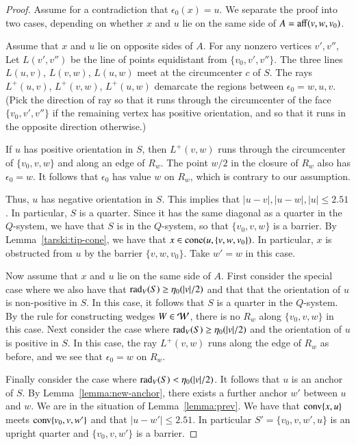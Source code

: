 \begin{proof} Assume for a contradiction that $\epsilon_0(x)=u$.
We separate the proof into two cases, depending on whether
$x$ and $u$ lie on the same side of $A={\operatorname{aff}}(v,w,v_0)$.

Assume that $x$ and $u$ lie on opposite sides of $A$.
For any nonzero vertices $v',v''$,
Let $L(v',v'')$ be the line of points equidistant from $\{v_0,v',v''\}$.
The three lines $L(u,v)$, $L(v,w)$, $L(u,w)$ meet at the circumcenter
$c$ of $S$.  The rays $L^+(u,v)$, $L^+(v,w)$, $L^+(u,w)$ demarcate
the regions between $\epsilon_0=w,u,v$.  (Pick the direction
of ray so that it runs through the circumcenter of the face $\{v_0,v',v''\}$
if the remaining vertex has positive orientation, and so that it
runs in the opposite direction otherwise.)

If $u$ has positive orientation in $S$, then $L^+(v,w)$ runs through
the circumcenter of $\{v_0,v,w\}$ and along an edge of $R_w$.
The point $w/2$ in the closure of  $R_w$ also has $\epsilon_0=w$.
It follows that $\epsilon_0$ has value $w$ on $R_w$, which is contrary
to our assumption.

Thus, $u$ has negative orientation in $S$.  
This implies that $|u-v|,|u-w|,|u|\le 2.51$.  In particular,
$S$ is a quarter.  Since it has the same diagonal as a quarter in
the $Q$-system, we have that $S$ is in the $Q$-system, so that
$\{v_0,v,w\}$ is a barrier.  By Lemma~\ref{tarski:tip-cone}, we have
that $x\in {\operatorname{cone}}(u,\{v,w,v_0\})$.  In particular, $x$ is obstructed
from $u$ by the barrier $\{v,w,v_0\}$.  Take $w'=w$ in this case.

Now assume that $x$ and $u$ lie on the same side of $A$.
First consider the special case where
we also have that $\operatorname{rad}_V(S)\ge \eta_0(|v|/2)$ and that that
the orientation of $u$ is non-positive in $S$.  In this case, it
follows that $S$ is a quarter in the $Q$-system.  By the rule
for constructing wedges $W\in{\mathcal W}$, there is no $R_w$ along $\{v_0,v,w\}$
in this case.  Next consider the case where
$\operatorname{rad}_V(S)\ge \eta_0(|v|/2)$ and the orientation of $u$ is positive
in $S$.  In this case, the ray $L^+(v,w)$ runs along the edge of 
$R_w$ as before, and we see that $\epsilon_0=w$ on $R_w$.

Finally consider the case where $\operatorname{rad}_V(S)<\eta_0(|v|/2)$.
It follows that $u$ is an anchor of $S$.
By Lemma~\ref{lemma:new-anchor}, there exists a further anchor
$w'$ between $u$ and $w$.  We are in the situation of Lemma~\ref{lemma:prev}.
We have that ${\operatorname{conv}}\{x,u\}$ meets ${\operatorname{conv}}\{v_0,v,w'\}$ and
that $|u-w'|\le 2.51$.  In particular $S'=\{v_0,v,w',u\}$ is
an upright quarter and $\{v_0,v,w'\}$ is a barrier.
\end{proof}



